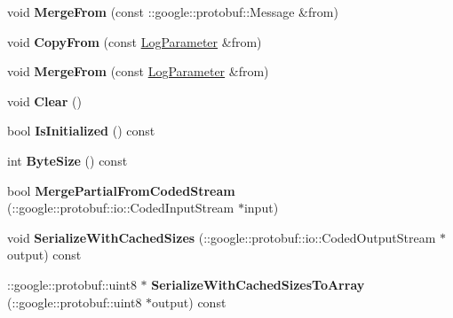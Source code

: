 \begin{DoxyCompactItemize}
void {\bfseries Merge\+From} (const \+::google\+::protobuf\+::\+Message \&from)
\item 
\mbox{\label{classcaffe_1_1_log_parameter_a06993a9a42b89ac4a127c751d7b431c7}} 
void {\bfseries Copy\+From} (const \mbox{\hyperlink{classcaffe_1_1_log_parameter}{Log\+Parameter}} \&from)
\item 
\mbox{\label{classcaffe_1_1_log_parameter_acc46f9d1b6e0308fec6ec8b1ad9a02c9}} 
void {\bfseries Merge\+From} (const \mbox{\hyperlink{classcaffe_1_1_log_parameter}{Log\+Parameter}} \&from)
\item 
\mbox{\label{classcaffe_1_1_log_parameter_a8bc12d70e742c9edcd62342bff75d67a}} 
void {\bfseries Clear} ()
\item 
\mbox{\label{classcaffe_1_1_log_parameter_a61a4eaeb0397f2a96d93ec3797a61379}} 
bool {\bfseries Is\+Initialized} () const
\item 
\mbox{\label{classcaffe_1_1_log_parameter_a2c00b06bae6b98f47dc31e87ad4330cf}} 
int {\bfseries Byte\+Size} () const
\item 
\mbox{\label{classcaffe_1_1_log_parameter_a6f8db5a31f896f9e9c0178553e0b31e0}} 
bool {\bfseries Merge\+Partial\+From\+Coded\+Stream} (\+::google\+::protobuf\+::io\+::\+Coded\+Input\+Stream $\ast$input)
\item 
\mbox{\label{classcaffe_1_1_log_parameter_a7786e8ad372b62629ff3de86c3b9a736}} 
void {\bfseries Serialize\+With\+Cached\+Sizes} (\+::google\+::protobuf\+::io\+::\+Coded\+Output\+Stream $\ast$output) const
\item 
\mbox{\label{classcaffe_1_1_log_parameter_a445d5a4fb4ba440f8175bd8af74518ad}} 
\+::google\+::protobuf\+::uint8 $\ast$ {\bfseries Serialize\+With\+Cached\+Sizes\+To\+Array} (\+::google\+::protobuf\+::uint8 $\ast$output) const
\item 
\mbox{\label{classcaffe_1_1_log_parameter_a5e518a6d2f64168bbbfeb4f263216f41}} 

\end{DoxyCompactItemize}
